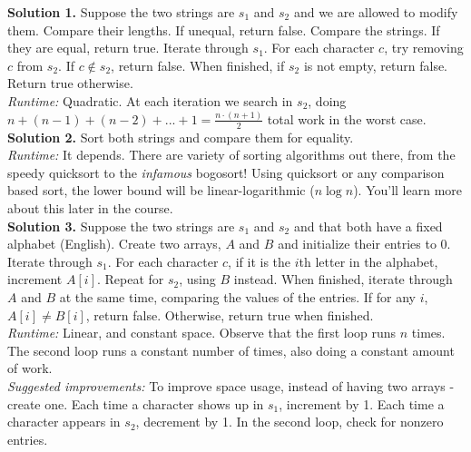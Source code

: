 \textbf{Solution 1.} Suppose the two strings are $s_1$ and $s_2$ and we are allowed to modify them. Compare their lengths. If unequal, return false. Compare the strings. If they are equal, return true. Iterate through $s_1$. For each character $c$, try removing $c$ from $s_2$. If $c \notin s_2$, return false. When finished, if $s_2$ is not empty, return false. Return true otherwise.\\

\textit{Runtime: } Quadratic. At each iteration we search in $s_2$, doing $n + (n-1) + (n-2) + ... + 1 = \frac{n\cdot(n+1)}{2}$ total work in the worst case.\\

\textbf{Solution 2.} Sort both strings and compare them for equality.\\

\textit{Runtime: } It depends. There are variety of sorting algorithms out there, from the speedy quicksort to the \textit{infamous} bogosort! Using quicksort or any comparison based sort, the lower bound will be linear-logarithmic ($n \log n$). You'll learn more about this later in the course.\\

\textbf{Solution 3.} Suppose the two strings are $s_1$ and $s_2$ and that both have a fixed alphabet (English). Create two arrays, $A$ and $B$ and initialize their entries to $0$. Iterate through $s_1$. For each character $c$, if it is the $i$th letter in the alphabet, increment $A[i]$. Repeat for $s_2$, using $B$ instead. When finished, iterate through $A$ and $B$ at the same time,
comparing the values of the entries. If for any $i$, $A[i] \neq B[i]$, return false. Otherwise, return true when finished.\\

\textit{Runtime:} Linear, and constant space. Observe that the first loop runs $n$ times. The second loop runs a constant number of times, also doing a constant amount of work.\\

\textit{Suggested improvements:} To improve space usage, instead of having two arrays - create one. Each time a character shows up in $s_1$, increment by 1. Each time a character appears in $s_2$, decrement by 1. In the second loop, check for nonzero entries.\\

